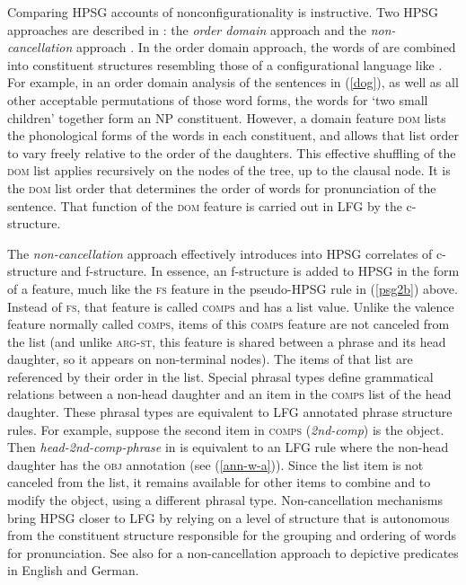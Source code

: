 Comparing HPSG accounts of nonconfigurationality is instructive.   Two HPSG approaches are described in : the \emph{order domain} approach \citep{DS99a} and the \emph{non-cancellation} approach \citep{Bender2008a}. 
In the order domain approach, the words of  are combined into constituent structures resembling those of a configurational language like .  For example, in an order domain analysis of the  sentences in (\ref{dog}), as well as all other acceptable permutations of those word forms, the words for `two small children' together form an NP constituent.  However, a domain feature \textsc{dom} lists the phonological forms of the words in each constituent, and allows that list order to vary freely relative to the order of the daughters.  This effective shuffling of the \textsc{dom} list applies recursively on the nodes of the tree, up to the clausal node.  It is the \textsc{dom} list order that determines the order of words for  pronunciation of the sentence.  That function of the \textsc{dom} feature is carried out in LFG by the c-structure.    

The \textit{non-cancellation} approach  effectively introduces into HPSG correlates of c-structure and f-structure.  In essence, an f-structure is added to HPSG in the form of a feature, much like the \textsc{fs} feature in the pseudo-HPSG rule in (\ref{psg2b}) above.  Instead of \textsc{fs}, that feature is called \textsc{comps} and has a list value.  Unlike the valence feature normally called \textsc{comps}, items of this \textsc{comps} feature are not canceled from the list (and unlike \textsc{arg-st}, this feature is shared between a phrase and its head daughter, so it appears on non-terminal nodes).  The items of that list are referenced by their order in the list.  Special phrasal types define grammatical relations between a non-head daughter and an item in the \textsc{comps} list of the head daughter.  These phrasal types are equivalent to LFG annotated phrase structure rules.  For example, suppose the second item in \textsc{comps} (\textit{2nd-comp}) is the object.  Then \textit{head-2nd-comp-phrase} in \citet[12]{Bender2008a} is equivalent to an LFG rule where the non-head daughter has the \textsc{obj} annotation (see (\ref{ann-w-a})).  Since the list item is not canceled from the list, it remains available for other items to combine and to modify the object, using a different phrasal type.  Non-cancellation mechanisms bring HPSG closer to LFG by relying on a level of structure that is autonomous from the constituent structure  responsible for the grouping and ordering of words for pronunciation. See also  for a non-cancellation approach to depictive predicates in English and German. 

